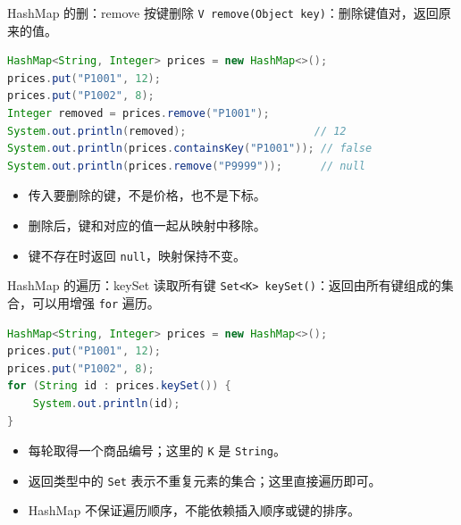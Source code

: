 \documentclass[aspectratio=169]{beamer}
\begin{document}
\begin{frame}[fragile]{HashMap 的删：remove 按键删除}
  \texttt{V remove(Object key)}：删除键值对，返回原来的值。
  \begin{lstlisting}[language=Java]
HashMap<String, Integer> prices = new HashMap<>();
prices.put("P1001", 12);
prices.put("P1002", 8);
Integer removed = prices.remove("P1001");
System.out.println(removed);                    // 12
System.out.println(prices.containsKey("P1001")); // false
System.out.println(prices.remove("P9999"));      // null
  \end{lstlisting}
  \begin{itemize}
    \item 传入要删除的\alert{键}，不是价格，也不是下标。
    \item 删除后，键和对应的值一起从映射中移除。
    \item 键不存在时返回 \texttt{null}，映射保持不变。
  \end{itemize}
\end{frame}

\begin{frame}[fragile]{HashMap 的遍历：keySet 读取所有键}
  \texttt{Set<K> keySet()}：返回由所有键组成的集合，可以用增强 \texttt{for} 遍历。
  \begin{lstlisting}[language=Java]
HashMap<String, Integer> prices = new HashMap<>();
prices.put("P1001", 12);
prices.put("P1002", 8);
for (String id : prices.keySet()) {
    System.out.println(id);
}
  \end{lstlisting}
  \begin{itemize}
    \item 每轮取得一个商品编号；这里的 \texttt{K} 是 \texttt{String}。
    \item 返回类型中的 \texttt{Set} 表示不重复元素的集合；这里直接遍历即可。
    \item \alert{HashMap 不保证遍历顺序}，不能依赖插入顺序或键的排序。
  \end{itemize}
\end{frame}

\end{document}
